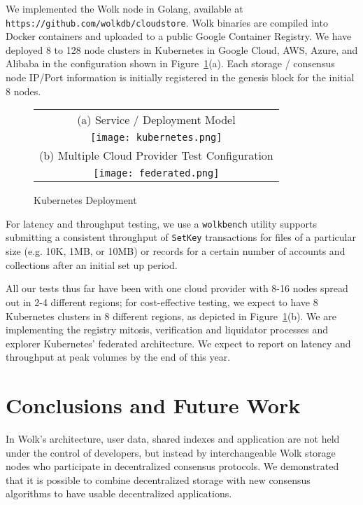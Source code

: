 \documentclass[journal]{IEEEtran}
\begin{document}
We implemented the Wolk node in Golang, available at {\tt https://github.com/wolkdb/cloudstore}.  Wolk binaries are compiled into Docker containers and uploaded to a public Google Container Registry.    We have deployed 8 to 128 node clusters in Kubernetes in Google Cloud, AWS, Azure, and Alibaba in the configuration shown in Figure~\ref{fig:kubernetes}(a).   Each storage / consensus node IP/Port information is initially registered in the genesis block for the initial 8 nodes.

\begin{figure}
    \centering
    \begin{tabular}{c}
     (a) Service / Deployment Model \\
     \texttt{[image: kubernetes.png]} \\
     (b) Multiple Cloud Provider Test Configuration  \\
     \texttt{[image: federated.png]}
    \end{tabular}
    \caption{Kubernetes Deployment}
    \label{fig:kubernetes}
\end{figure}

For latency and throughput testing, we use a {\tt wolkbench} utility supports submitting a consistent throughput of {\tt SetKey} transactions for files of a particular size (e.g. 10K, 1MB, or 10MB) or records for a certain number of accounts and collections after an initial set up period.

All our tests thus far have been with one cloud provider with 8-16 nodes spread out in 2-4 different regions; for cost-effective testing, we expect to have 8 Kubernetes clusters in 8 different regions, as depicted in Figure~\ref{fig:kubernetes}(b).  We are implementing the registry mitosis, verification and liquidator processes and explorer Kubernetes' federated architecture.  We expect to report on latency and throughput at peak volumes by the end of this year.

\section{Conclusions and Future Work}

In Wolk's architecture, user data, shared indexes and application are not held under the control of developers, but instead by interchangeable Wolk storage nodes who participate in decentralized consensus protocols.   We demonstrated that it is possible to combine decentralized storage with new consensus algorithms to have usable decentralized applications.
\end{document}
